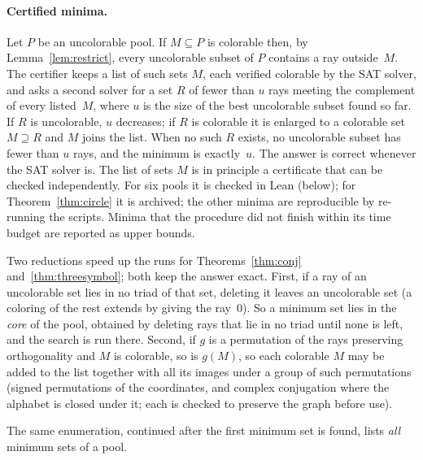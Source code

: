 \paragraph{Certified minima.}  Let $P$ be an uncolorable pool.  If $M\subseteq P$ is colorable
then, by Lemma~\ref{lem:restrict}, every uncolorable subset of $P$ contains a ray outside~$M$.
The certifier keeps a list of such sets $M$, each verified colorable by the SAT solver, and asks
a second solver for a set $R$ of fewer than $u$ rays meeting the complement of every listed~$M$,
where $u$ is the size of the best uncolorable subset found so far.  If $R$ is uncolorable, $u$
decreases; if $R$ is colorable it is enlarged to a colorable set $M\supseteq R$ and $M$ joins the
list.  When no such $R$ exists, no uncolorable subset has fewer than $u$ rays, and the minimum is
exactly~$u$.  The answer is correct whenever the SAT solver is.  The list of sets $M$ is in principle a
certificate that can be checked independently.  For six pools it is checked in Lean (below);
for Theorem~\ref{thm:circle} it is archived; the other minima are reproducible by re-running
the scripts.  Minima that the procedure did not finish within
its time budget are reported as upper bounds.

Two reductions speed up the runs for Theorems~\ref{thm:conj} and~\ref{thm:threesymbol}; both
keep the answer exact.  First, if a ray of an uncolorable set lies in no triad of that set,
deleting it leaves an uncolorable set (a coloring of the rest extends by giving the ray~0).  So a
minimum set lies in the \emph{core} of the pool, obtained by deleting rays that lie in no triad
until none is left, and the search is run there.  Second, if
$g$ is a permutation of the rays preserving orthogonality and $M$ is colorable, so is $g(M)$, so
each colorable $M$ may be added to the list together with all its images under a group of such
permutations (signed permutations of the coordinates, and complex conjugation where the alphabet
is closed under it; each is checked to preserve the graph before use).

The same enumeration, continued after the first
minimum set is found, lists \emph{all} minimum sets of a pool.


